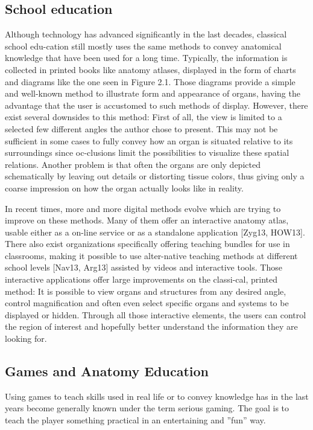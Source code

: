 \subsection{School education}
Although technology has advanced significantly in the last decades, classical school edu-cation still mostly uses the same methods to convey anatomical knowledge that have been used for a long time. Typically, the information is collected in printed books like anatomy atlases, displayed in the form of charts and diagrams like the one seen in Figure 2.1. Those diagrams provide a simple and well-known method to illustrate form and appearance of organs, having the advantage that the user is accustomed to such methods of display. However, there exist several downsides to this method: First of all, the view is limited to a selected few different angles the author chose to present. This may not be sufficient in some cases to fully convey how an organ is situated relative to its surroundings since oc-clusions limit the possibilities to visualize these spatial relations. Another problem is that often the organs are only depicted schematically by leaving out details or distorting tissue colors, thus giving only a coarse impression on how the organ actually looks like in reality.

In recent times, more and more digital methods evolve which are trying to improve on these methods. Many of them offer an interactive anatomy atlas, usable either as a on-line service or as a standalone application [Zyg13, HOW13]. There also exist organizations specifically offering teaching bundles for use in classrooms, making it possible to use alter-native teaching methods at different school levels [Nav13, Arg13] assisted by videos and interactive tools. Those interactive applications offer large improvements on the classi-cal, printed method: It is possible to view organs and structures from any desired angle, control magnification and often even select specific organs and systems to be displayed or hidden. Through all those interactive elements, the users can control the region of interest and hopefully better understand the information they are looking for.


\subsection{Games and Anatomy Education}

Using games to teach skills used in real life or to convey knowledge has in the last years become generally known under the term serious gaming. The goal is to teach the player something practical in an entertaining and ”fun” way.

